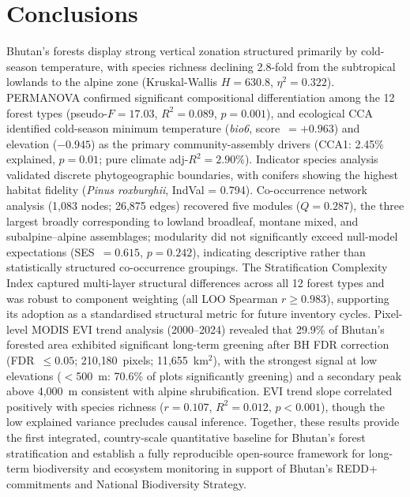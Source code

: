 \documentclass[review,12pt,a4paper]{elsarticle}
\begin{document}
\section{Conclusions}
\label{sec:conclusions}

Bhutan's forests display strong vertical zonation structured primarily by
cold-season temperature, with species richness declining 2.8-fold from the
subtropical lowlands to the alpine zone
(Kruskal-Wallis $H = 630.8$, $\eta^2 = 0.322$). PERMANOVA confirmed
significant compositional differentiation among the 12 forest types
(pseudo-$F = 17.03$, $R^2 = 0.089$, $p = 0.001$), and ecological CCA
identified cold-season minimum temperature (\textit{bio6}, score~$= +0.963$)
and elevation ($-0.945$) as the primary community-assembly drivers (CCA1:
2.45\% explained, $p = 0.01$; pure climate adj-$R^2 = 2.90\%$). Indicator
species analysis validated discrete phytogeographic boundaries, with conifers
showing the highest habitat fidelity (\textit{Pinus roxburghii}, IndVal =
0.794). Co-occurrence network analysis (1{,}083 nodes; 26{,}875 edges)
recovered five modules ($Q = 0.287$), the three largest broadly corresponding
to lowland broadleaf, montane mixed, and subalpine--alpine assemblages;
modularity did not significantly exceed null-model expectations
(SES~$= 0.615$, $p = 0.242$), indicating descriptive rather than
statistically structured co-occurrence groupings. The Stratification Complexity
Index captured multi-layer structural differences across all 12 forest types
and was robust to component weighting (all LOO Spearman $r \geq 0.983$),
supporting its adoption as a standardised structural metric for future
inventory cycles. Pixel-level MODIS EVI trend analysis (2000--2024) revealed
that 29.9\% of Bhutan's forested area exhibited significant long-term greening
after BH FDR correction (FDR~$\leq 0.05$; 210{,}180~pixels;
11{,}655~km$^2$), with the strongest signal at low elevations ($<$500~m:
70.6\% of plots significantly greening) and a secondary peak above 4{,}000~m
consistent with alpine shrubification. EVI trend slope correlated positively
with species richness ($r = 0.107$, $R^2 = 0.012$, $p < 0.001$), though the
low explained variance precludes causal inference. Together, these results
provide the first integrated, country-scale quantitative baseline for Bhutan's
forest stratification and establish a fully reproducible open-source framework
for long-term biodiversity and ecosystem monitoring in support of Bhutan's
REDD+ commitments and National Biodiversity Strategy.
\end{document}
